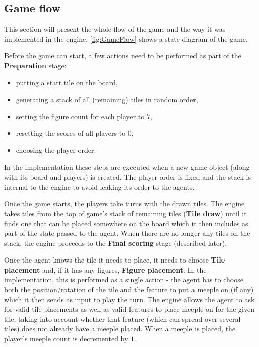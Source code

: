 \subsection{Game flow}

This section will present the whole flow of the game and the way it was implemented in the engine.
\ref{fig:GameFlow} shows a state diagram of the game.

\begin{figure*}
	\centering
	\scalebox{.42}{}
	\caption{Carcassonne's state diagram}
	\label{fig:GameFlow}
\end{figure*}

Before the game can start, a few actions need to be performed as part of the \textbf{Preparation} stage:
\begin{itemize}
	\item putting a start tile on the board,
	\item generating a stack of all (remaining) tiles in random order,
	\item setting the figure count for each player to $7$,
	\item resetting the scores of all players to 0,
	\item choosing the player order.
\end{itemize}
In the implementation these steps are executed when a new game object (along with its board
and players) is created. The player order is fixed and the stack is internal to the engine
to avoid leaking its order to the agents.

Once the game starts, the players take turns with the drawn tiles. The engine takes tiles from
the top of game's stack of remaining tiles (\textbf{Tile draw}) until it finds one that can be
placed somewhere on the board which it then includes as part of the state passed to the agent.
When there are no longer any tiles on the stack, the engine proceeds to
the \textbf{Final scoring} stage (described later).

Once the agent knows the tile it needs to place, it needs to choose \textbf{Tile placement} and,
if it has any figures, \textbf{Figure placement}. In the implementation, this is performed
as a single action - the agent has to choose both the position/rotation of the tile and the feature
to put a meeple on (if any) which it then sends as input to play the turn.
The engine allows the agent to ask for valid tile placements as well as valid features to
place meeple on for the given tile, taking into account whether that feature (which can spread
over several tiles) does not already have a meeple placed. When a meeple is placed,
the player's meeple count is decremented by $1$.

